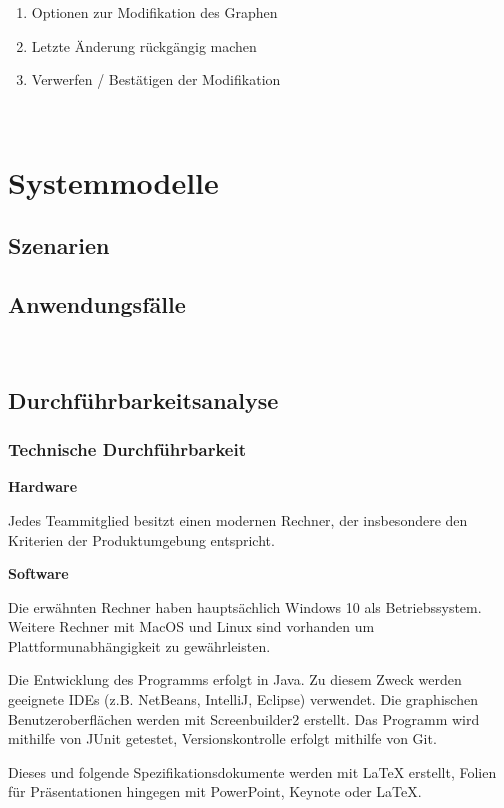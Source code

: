 \documentclass{article}
\begin{document}
	\FloatBarrier
	
	\begin{enumerate}[(1)]
		\item{Optionen zur Modifikation des Graphen}
		\item{Letzte Änderung rückgängig machen}
		\item{Verwerfen / Bestätigen der Modifikation}
	\end{enumerate}
	
	~\newpage
	\section{Systemmodelle}
	\subsection{Szenarien}
	\subsection{Anwendungsfälle}
	
	~\newpage
	\subsection{Durchführbarkeitsanalyse}
	\subsubsection{Technische Durchführbarkeit}
	\textbf{Hardware}
	
	Jedes Teammitglied besitzt einen modernen Rechner, der insbesondere den Kriterien der Produktumgebung entspricht.
	\newline
	
	\textbf{Software}
	
	Die erwähnten Rechner haben hauptsächlich Windows 10 als Betriebssystem. Weitere Rechner mit MacOS und Linux sind vorhanden um Plattformunabhängigkeit zu gewährleisten.
	
	Die Entwicklung des Programms erfolgt in Java. Zu diesem Zweck werden geeignete IDEs (z.B. NetBeans, IntelliJ, Eclipse) verwendet. Die graphischen Benutzeroberflächen werden mit Screenbuilder2 erstellt. Das Programm wird mithilfe von JUnit getestet, Versionskontrolle erfolgt mithilfe von Git.
	
	Dieses und folgende Spezifikationsdokumente werden mit LaTeX erstellt, Folien für Präsentationen hingegen mit PowerPoint, Keynote oder LaTeX.
	\newline
	
\end{document}
